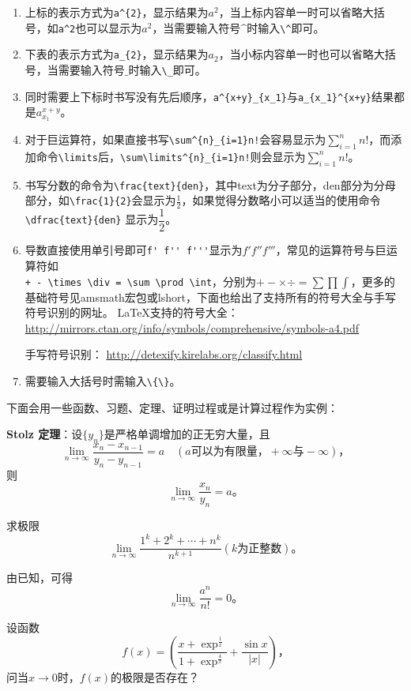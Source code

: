 \begin{enumerate}[1.]
\item 上标的表示方式为\verb|a^{2}|，显示结果为$a^{2}$，当上标内容单一时可以省略大括号，如\verb|a^2|也可以显示为$a^2$，当需要输入符号$\^$时输入\verb|\^|即可。
\item 下表的表示方式为\verb|a_{2}|，显示结果为$a_{2}$，当小标内容单一时也可以省略大括号，当需要输入符号$\_$时输入\verb|\_|即可。
\item 同时需要上下标时书写没有先后顺序，\verb|a^{x+y}_{x_1}|与\verb|a_{x_1}^{x+y}|结果都是$a_{x_1}^{x+y}$。
\item 对于巨运算符，如果直接书写\verb|\sum^{n}_{i=1}n!|会容易显示为$\sum^{n}_{i=1}n!$，而添加命令\verb|\limits|后，\verb|\sum\limits^{n}_{i=1}n!|则会显示为$\sum\limits^{n}_{i=1}n!$。
\item 书写分数的命令为\verb|\frac{text}{den}|，其中text为分子部分，den部分为分母部分，如\verb|\frac{1}{2}|会显示为$\frac{1}{2}$，如果觉得分数略小可以适当的使用命令\verb|\dfrac{text}{den}|
显示为$\dfrac{1}{2}$。
\item 导数直接使用单引号即可\verb|f' f'' f'''|显示为$f' f'' f'''$，常见的运算符号与巨运算符如\\\verb|+ - \times \div = \sum \prod \int|，分别为$+ - \times \div = \sum \prod \int$，更多的基础符号见amsmath宏包或lshort，下面也给出了支持所有的符号大全与手写符号识别的网址。
\LaTeX 支持的符号大全：
\url{http://mirrors.ctan.org/info/symbols/comprehensive/symbols-a4.pdf}

手写符号识别：
\url{http://detexify.kirelabs.org/classify.html}
\item 需要输入大括号时需输入\verb|\{\}|。
\end{enumerate}
下面会用一些函数、习题、定理、证明过程或是计算过程作为实例：

\textbf{Stolz 定理}：设$\{y_n\}$是严格单调增加的正无穷大量，且
\[
\lim\limits_{n \to \infty}\frac{x_n-x_{n-1}}{y_n-y_{n-1}}=a\quad (a\text{可以为有限量，}+\infty\text{与}-\infty)\text{，}
\]
则
\[
\lim\limits_{n \to \infty}\frac{x_n}{y_n}=a\text{。}
\]

求极限
\[
\lim\limits_{n \to \infty}\frac{1^k+2^k+\cdots+n^k}{n^{k+1}}(k\text{为正整数})\text{。}
\]

由已知，可得
\begin{equation}\label{equ1}
\lim\limits_{n \to \infty}\frac{a^n}{n!}=0\text{。}
\end{equation}

设函数
\[
f(x)=(\frac{x+\exp^{\frac{1}{x}}}{1+\exp^{\frac{4}{x}}}+\frac{\sin x}{|x|})\text{，}
\]
问当$x\to 0$时，$f(x)$的极限是否存在？

